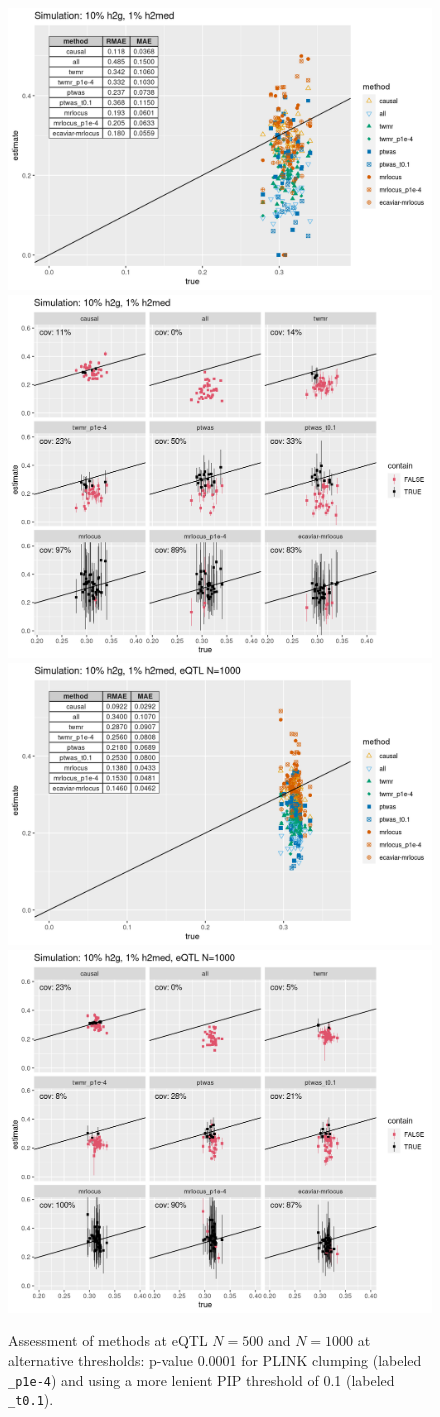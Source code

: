 \documentclass[11pt]{article}
\begin{document}
\begin{figure}[!ht]
  \centering
  \includegraphics[width=.52\textwidth]{figs/sim1extra.png}
  \includegraphics[width=.4\textwidth]{figs/cover1extra.png} \\
  \includegraphics[width=.52\textwidth]{figs/simhigh_nextra.png}
  \includegraphics[width=.4\textwidth]{figs/coverhigh_nextra.png}
  \caption{Assessment of methods at eQTL $N=500$ and $N=1000$ at
    alternative thresholds: p-value 0.0001 for PLINK clumping
    (labeled \texttt{\_p1e-4}) and using a more lenient PIP threshold
    of 0.1 (labeled \texttt{\_t0.1}).}
\end{figure}
\end{document}
